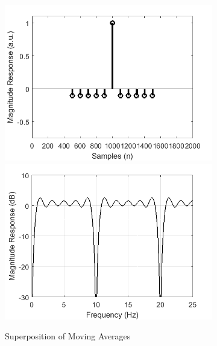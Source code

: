 \documentclass[a4paper]{article}
\begin{document}
\begin{figure}[hbtp]
    \begin{subfigure}{.5\textwidth}
        \includegraphics[width=\textwidth]{img/kernel_sma.png}\\
        \includegraphics[width=\textwidth]{img/mag_sma.png}
        \caption{Superposition of Moving Averages}\label{fig:SMAKernel}
    \end{subfigure}
    \begin{subfigure}{.5\textwidth}

\end{subfigure}
\end{figure}
\end{document}
